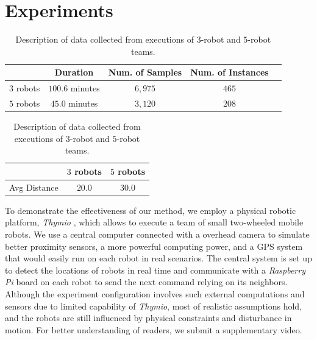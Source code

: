 \documentclass[letterpaper, 10 pt, conference]{ieeeconf}  %
\begin{document}
	
	
	\section{Experiments} 
	\label{sec:experiments} 
	
	
	\begin{table}[t]
		\label{table:data_description}
		\centering
		\begin{tabular}{|c|c|c|c|c|}
			\hline
						&  Duration & Num. of Samples & Num. of Instances  \\ \hline
			$3$ robots & $100.6$ minutes & $6,975$ & $465$  \\ \hline
			$5$ robots & $45.0$ minutes  & $3,120$ & $208$  \\ \hline
		\end{tabular}
		\caption{Description of data collected from executions of $3$-robot and $5$-robot teams.}
	\end{table}

	\begin{table}[]
		\label{table:overall_performance}
		\centering
		\begin{tabular}{|c|c|c|}
			\hline
			&  $3$ robots & $5$ robots  \\ \hline
			Avg Distance & $20.0$ & $30.0$  \\ \hline
		\end{tabular}	
		\caption{Description of data collected from executions of $3$-robot and $5$-robot teams.}
	\end{table}
	
	
	To demonstrate the effectiveness of our method, we employ a physical robotic platform, 
	\emph{Thymio} \cite{Shin14}, which allows to execute a team of small two-wheeled mobile robots.   
	We use a central computer connected with a overhead camera to simulate better proximity 
	sensors, a more powerful computing power, and a GPS system that would easily run on each robot in 
	real scenarios. The central system is set up to detect the locations of robots in real time 
	and communicate with a \emph{Raspberry Pi} board \cite{Upton14} on each robot to send
	the next command relying on its neighbors. Although the experiment configuration involves 
	such external computations and sensors due to limited capability of \emph{Thymio}, 
	most of realistic assumptions hold, and the robots are still influenced by 
	physical constraints and disturbance in motion. For better understanding of readers, 
	we submit a supplementary video. 
	
\end{document}

